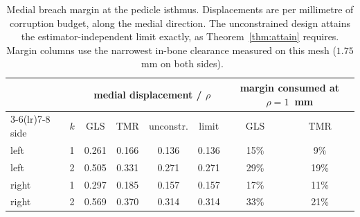 \begin{table}[t]
\centering\footnotesize
\caption{Medial breach margin at the pedicle isthmus. Displacements are per millimetre of corruption budget, along the medial direction. The unconstrained design attains the estimator-independent limit exactly, as Theorem~\ref{thm:attain} requires. Margin columns use the narrowest in-bone clearance measured on this mesh ($1.75$~mm on both sides).}
\label{tab:breach}
\begin{tabular}{@{}llcccccc@{}}
\toprule
& & \multicolumn{4}{c}{medial displacement / $\rho$} & \multicolumn{2}{c}{margin consumed at $\rho=1$~mm} \\
\cmidrule(lr){3-6}\cmidrule(lr){7-8}
side & $k$ & GLS & TMR & unconstr. & limit & GLS & TMR \\
\midrule
left & 1 & 0.261 & 0.166 & 0.136 & 0.136 & 15\% & 9\% \\
left & 2 & 0.505 & 0.331 & 0.271 & 0.271 & 29\% & 19\% \\
right & 1 & 0.297 & 0.185 & 0.157 & 0.157 & 17\% & 11\% \\
right & 2 & 0.569 & 0.370 & 0.314 & 0.314 & 33\% & 21\% \\
\bottomrule
\end{tabular}
\end{table}
